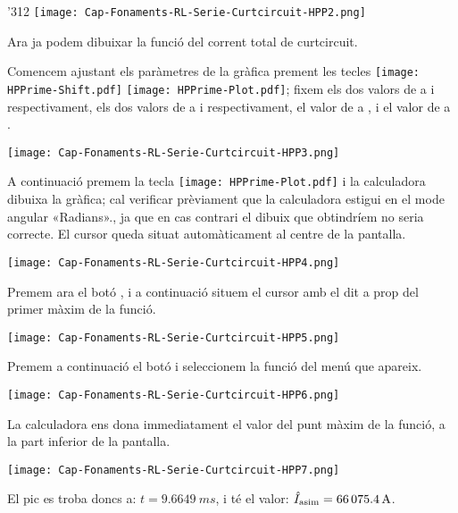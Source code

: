 \begin{exemple}
\begin{dingautolist}{'312}
            \texttt{[image: Cap-Fonaments-RL-Serie-Curtcircuit-HPP2.png]}

        \item Ara ja podem dibuixar la funció del corrent total de curtcircuit.

            Comencem ajustant els paràmetres de la gràfica prement les tecles \texttt{[image: HPPrime-Shift.pdf]} \texttt{[image: HPPrime-Plot.pdf]}; fixem els dos valors de  a  i  respectivament, els dos valors de  a  i  respectivament, el valor de  a , i el valor de  a .

            \texttt{[image: Cap-Fonaments-RL-Serie-Curtcircuit-HPP3.png]}
            \break

        \item A continuació premem la tecla \texttt{[image: HPPrime-Plot.pdf]} i la calculadora dibuixa la gràfica; cal verificar prèviament que la calculadora estigui en el mode angular «Radians»., ja que en cas contrari el dibuix que obtindríem no seria correcte. El cursor queda situat automàticament al centre de la pantalla.

            \texttt{[image: Cap-Fonaments-RL-Serie-Curtcircuit-HPP4.png]}

        \item Premem ara el botó , i a continuació situem el cursor amb el dit a prop del primer màxim de la funció.

            \texttt{[image: Cap-Fonaments-RL-Serie-Curtcircuit-HPP5.png]}

        \item Premem a continuació el botó  i seleccionem la funció  del menú que apareix.

            \texttt{[image: Cap-Fonaments-RL-Serie-Curtcircuit-HPP6.png]}

        \item La calculadora ens dona immediatament el valor del punt màxim de la funció, a la part inferior de la pantalla.

            \texttt{[image: Cap-Fonaments-RL-Serie-Curtcircuit-HPP7.png]}

            El pic es troba doncs a: $t=\SI{9,6649}{ms}$, i té el valor:  $\hat{I}_\mathrm{asim}=\SI{66075,4}{A}$.
    \end{dingautolist}

\end{exemple}


